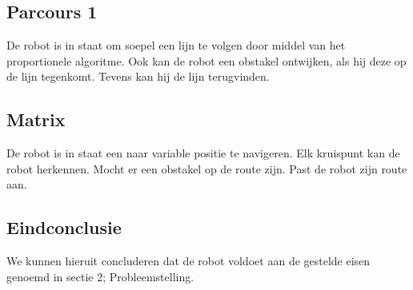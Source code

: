 \documentclass[12pt]{article}
\begin{document}
	\subsection{Parcours 1}
		De robot is in staat om soepel een lijn te volgen door middel van het proportionele algoritme. Ook kan de robot een obstakel ontwijken, als hij deze op de lijn tegenkomt. Tevens kan hij de lijn terugvinden.
	\subsection{Matrix}
		De robot is in staat een naar variable positie te navigeren. Elk kruispunt kan de robot herkennen. Mocht er een obstakel op de route zijn. Past de robot zijn route aan.
	\subsection{Eindconclusie}
		We kunnen hieruit concluderen dat de robot voldoet aan de gestelde eisen genoemd in sectie 2; Probleemstelling.
\end{document}
